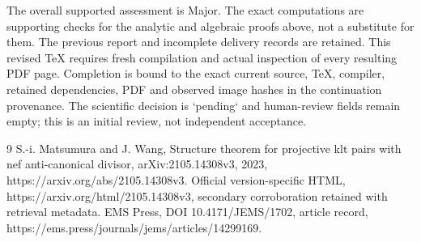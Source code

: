 \documentclass[10pt]{article}
\begin{document}
The overall supported assessment is Major. The exact computations are supporting checks for the analytic and algebraic proofs above, not a substitute for them. The previous report and incomplete delivery records are retained. This revised TeX requires fresh compilation and actual inspection of every resulting PDF page. Completion is bound to the exact current source, TeX, compiler, retained dependencies, PDF and observed image hashes in the continuation provenance. The scientific decision is `pending` and human-review fields remain empty; this is an initial review, not independent acceptance.\par
9 S.-i. Matsumura and J. Wang, Structure theorem for projective klt pairs with nef anti-canonical divisor, arXiv:2105.14308v3, 2023, https://arxiv.org/abs/2105.14308v3. Official version-specific HTML, https://arxiv.org/html/2105.14308v3, secondary corroboration retained with retrieval metadata. EMS Press, DOI 10.4171/JEMS/1702, article record, https://ems.press/journals/jems/articles/14299169.\par
\end{document}
